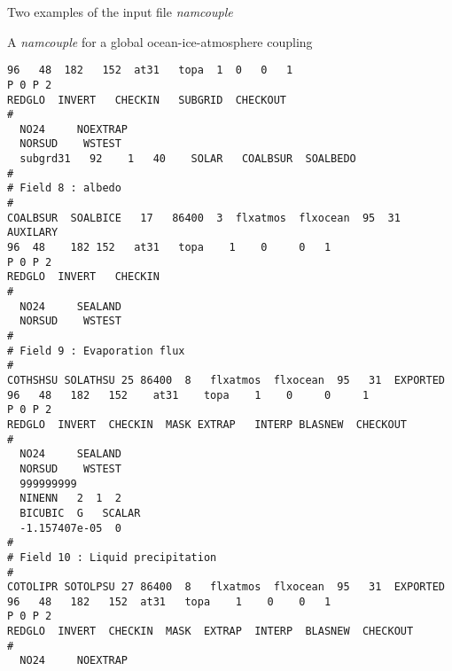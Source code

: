 \begin{section}{Two examples of the input file {\em namcouple}}
\begin{subsection}{A {\em namcouple} for a global ocean-ice-atmosphere coupling}
\begin{verbatim}
96   48  182   152  at31   topa  1  0   0   1  
P 0 P 2                            
REDGLO  INVERT   CHECKIN   SUBGRID  CHECKOUT                           
#                                                                       
  NO24     NOEXTRAP                                                        
  NORSUD    WSTEST                                                       
  subgrd31   92    1   40    SOLAR   COALBSUR  SOALBEDO                  
#                                                                       
# Field 8 : albedo                                                      
#                                                                       
COALBSUR  SOALBICE   17   86400  3  flxatmos  flxocean  95  31  AUXILARY
96  48    182 152   at31   topa    1    0     0   1 
P 0 P 2                       
REDGLO  INVERT   CHECKIN                                               
#                                                                       
  NO24     SEALAND                                                         
  NORSUD    WSTEST                                                      
#                                                                       
# Field 9 : Evaporation flux                                            
#                                                                       
COTHSHSU SOLATHSU 25 86400  8   flxatmos  flxocean  95   31  EXPORTED   
96   48   182   152    at31    topa    1    0     0     1  
P 0 P 2               
REDGLO  INVERT  CHECKIN  MASK EXTRAP   INTERP BLASNEW  CHECKOUT        
#                                                                       
  NO24     SEALAND                                                          
  NORSUD    WSTEST                                                        
  999999999                                                       
  NINENN   2  1  2                                                           
  BICUBIC  G   SCALAR                                          
  -1.157407e-05  0                                                        
#                                                                       
# Field 10 : Liquid precipitation                                       
#                                                                       
COTOLIPR SOTOLPSU 27 86400  8   flxatmos  flxocean  95   31  EXPORTED   
96   48   182   152  at31   topa    1    0    0   1  
P 0 P 2                    
REDGLO  INVERT  CHECKIN  MASK  EXTRAP  INTERP  BLASNEW  CHECKOUT       
#                                                                       
  NO24     NOEXTRAP                                                         

\end{verbatim}
\end{subsection}
\end{section}
